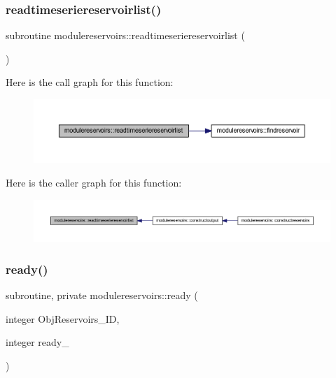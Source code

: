 \subsubsection{\texorpdfstring{readtimeseriereservoirlist()}{readtimeseriereservoirlist()}}
{\footnotesize\ttfamily subroutine modulereservoirs\+::readtimeseriereservoirlist (\begin{DoxyParamCaption}{ }\end{DoxyParamCaption})\hspace{0.3cm}{\ttfamily [private]}}

Here is the call graph for this function\+:\nopagebreak
\begin{figure}[H]
\begin{center}
\leavevmode
\includegraphics[width=350pt]{namespacemodulereservoirs_a24436967478aa33f4288a6cec5b2bb59_cgraph}
\end{center}
\end{figure}
Here is the caller graph for this function\+:\nopagebreak
\begin{figure}[H]
\begin{center}
\leavevmode
\includegraphics[width=350pt]{namespacemodulereservoirs_a24436967478aa33f4288a6cec5b2bb59_icgraph}
\end{center}
\end{figure}
\mbox{\label{namespacemodulereservoirs_a5aff53aba3466a0410c29761e37a55a5}} 
\subsubsection{\texorpdfstring{ready()}{ready()}}
{\footnotesize\ttfamily subroutine, private modulereservoirs\+::ready (\begin{DoxyParamCaption}\item[{integer}]{Obj\+Reservoirs\+\_\+\+ID,  }\item[{integer}]{ready\+\_\+ }\end{DoxyParamCaption})\hspace{0.3cm}{\ttfamily [private]}}

